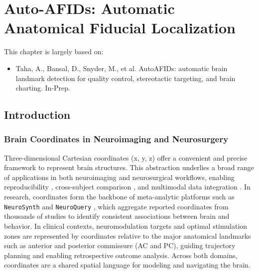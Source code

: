 \chapter{Auto-AFIDs: Automatic Anatomical Fiducial Localization} \label{chap:Autoafids}
\newpage
\sloppy
This chapter is largely based on:
\begin{itemize}[noitemsep,topsep=0pt]
	\item Taha, A., Bansal, D., Snyder, M., et al. AutoAFIDs: automatic brain landmark detection for quality control, stereotactic targeting, and brain charting. In-Prep.
\end{itemize}

\section{Introduction}
\subsection{Brain Coordinates in Neuroimaging and Neurosurgery}
Three-dimensional Cartesian coordinates (x, y, z) offer a convenient and precise framework to represent brain structures. This abstraction underlies a broad range of applications in both neuroimaging and neurosurgical workflows, enabling reproducibility \cite{Dockes2020-nw}, cross-subject comparison \cite{Glasser2016-ko}, and multimodal data integration \cite{Uludag2014-qz}. In research, coordinates form the backbone of meta-analytic platforms such as \texttt{NeuroSynth} \cite{Yarkoni2011-sr} and \texttt{NeuroQuery} \cite{Dockes2020-nw}, which aggregate reported coordinates from thousands of studies to identify consistent associations between brain and behavior. In clinical contexts, neuromodulation targets and optimal stimulation zones are represented by coordinates relative to the major anatomical landmarks \cite{Horn2017-bi} such as anterior and posterior commissure (AC and PC), guiding trajectory planning and enabling retrospective outcome analysis. Across both domains, coordinates are a shared spatial language for modeling and navigating the brain.

